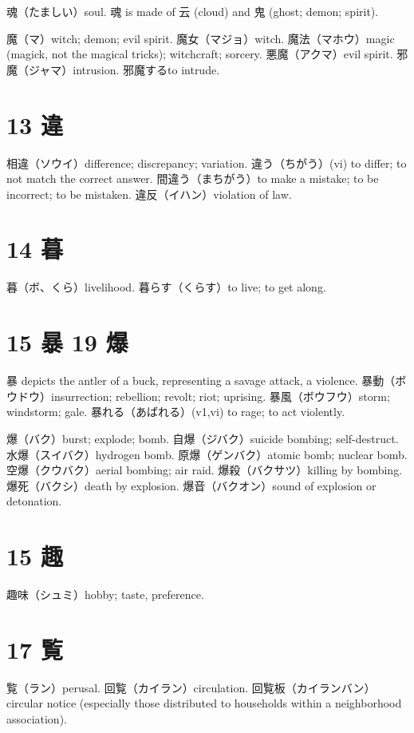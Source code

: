 魂（たましい）soul.
魂 is made of 云 (cloud) and 鬼 (ghost; demon; spirit).

魔（マ）witch; demon; evil spirit.
魔女（マジョ）witch.
魔法（マホウ）magic (magick, not the magical tricks); witchcraft; sorcery.
悪魔（アクマ）evil spirit.
邪魔（ジャマ）intrusion.
邪魔するto intrude.

\section{13 違}

相違（ソウイ）difference; discrepancy; variation.
違う（ちがう）(vi) to differ; to not match the correct answer.
間違う（まちがう）to make a mistake; to be incorrect; to be mistaken.
違反（イハン）violation of law.

\section{14 暮}

暮（ボ、くら）livelihood.
暮らす（くらす）to live; to get along.

\section{15 暴 19 爆}

暴 depicts the antler of a buck, representing a savage attack, a violence.
暴動（ボウドウ）insurrection; rebellion; revolt; riot; uprising.
暴風（ボウフウ）storm; windstorm; gale.
暴れる（あばれる）(v1,vi) to rage; to act violently.

爆（バク）burst; explode; bomb.
自爆（ジバク）suicide bombing; self-destruct.
水爆（スイバク）hydrogen bomb.
原爆（ゲンバク）atomic bomb; nuclear bomb.
空爆（クウバク）aerial bombing; air raid.
爆殺（バクサツ）killing by bombing.
爆死（バクシ）death by explosion.
爆音（バクオン）sound of explosion or detonation.

\section{15 趣}

趣味（シュミ）hobby; taste, preference.

\section{17 覧}

覧（ラン）perusal.
回覧（カイラン）circulation.
回覧板（カイランバン）circular notice
(especially those distributed to households within a neighborhood association).

